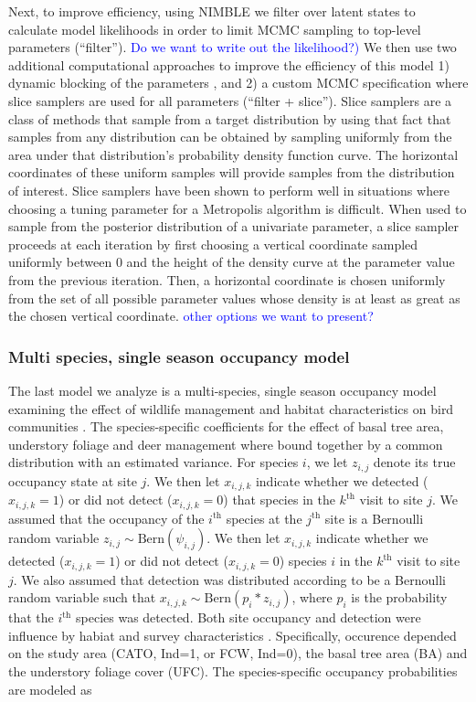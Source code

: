 \documentclass[12pt]{article}
\newcommand{\flagged}[1] {
  \textcolor{blue}{#1}
}
\begin{document}
Next, to improve efficiency, using NIMBLE we filter over latent states
to calculate model likelihoods in order to limit MCMC sampling to
top-level parameters (``filter''). \flagged{Do we want to write out
  the likelihood?)} We then use two additional computational
approaches to improve the efficiency of this model 1) dynamic blocking
of the parameters \citep[``filter + autoblocking'',
][]{turek2016efficient}, and 2) a custom MCMC specification where
slice samplers \citep{neal-03} are used for all parameters (``filter +
slice''). Slice samplers are a class of methods that sample from a
target distribution by using that fact that samples from any
distribution can be obtained by sampling uniformly from the area under
that distribution's probability density function curve.  The
horizontal coordinates of these uniform samples will provide samples
from the distribution of interest. Slice samplers have been shown to
perform well in situations where choosing a tuning parameter for a
Metropolis algorithm is difficult. When used to sample from the
posterior distribution of a univariate parameter, a slice sampler
proceeds at each iteration by first choosing a vertical coordinate
sampled uniformly between 0 and the height of the density curve at the
parameter value from the previous iteration.  Then, a horizontal
coordinate is chosen uniformly from the set of all possible parameter
values whose density is at least as great as the chosen vertical
coordinate.  \flagged{other options we want to present?}

\subsubsection*{Multi species, single season occupancy model}
\label{sec:msss}

The last model we analyze is a multi-species, single season occupancy
model examining the effect of wildlife management and habitat
characteristics on bird communities \citep{zipkin2010multi}. The
species-specific coefficients for the effect of basal tree area,
understory foliage and deer management where bound together by a
common distribution with an estimated variance.  For species $i$, we
let $z_{i,j}$ denote its true occupancy state at site $j$.  We then
let $x_{i,j,k}$ indicate whether we detected ($x_{i,j,k}=1$) or did
not detect ($x_{i,j,k}=0$) that species in the $k^{\mathrm{th}}$ visit
to site $j$.  We assumed that the occupancy of the $i^{\mathrm{th}}$
species at the $j^{\mathrm{th}}$ site is a Bernoulli random variable
$z_{i,j} \sim \mathrm{Bern}(\psi_{i,j})$. We then let $x_{i,j,k}$
indicate whether we detected ($x_{i,j,k}=1$) or did not detect
($x_{i,j,k}=0$) species $i$ in the $k^{\mathrm{th}}$ visit to site
$j$. We also assumed that detection was distributed according to be a
Bernoulli random variable such that $x_{i,j,k} \sim
\mathrm{Bern}(p_{i}*z_{i,j})$, where $p_{i}$ is the probability that
the $i^{\mathrm{th}}$ species was detected. Both site occupancy and
detection were influence by habiat and survey characteristics
\citep{zipkin2010multi}. Specifically, occurence depended on the study
area (CATO, Ind=1, or FCW, Ind=0), the basal tree area (BA) and the
understory foliage cover (UFC). The species-specific occupancy
probabilities are modeled as
\end{document}
